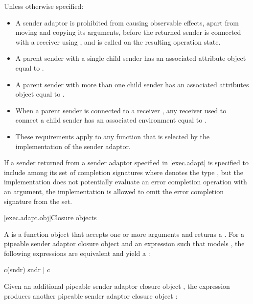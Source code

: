\pnum
Unless otherwise specified:
\begin{itemize}
\item
A sender adaptor is prohibited from causing observable effects,
apart from moving and copying its arguments,
before the returned sender is connected with a receiver using ,
and  is called on the resulting operation state.
\item
A parent sender with a single child sender  has
an associated attribute object equal to
.
\item
A parent sender with more than one child sender has
an associated attributes object equal to .
\item
When a parent sender is connected to a receiver ,
any receiver used to connect a child sender has
an associated environment equal to .
\item
These requirements apply to any function
that is selected by the implementation of the sender adaptor.
\end{itemize}

\pnum
If a sender returned from a sender adaptor specified in \ref{exec.adapt}
is specified to include 
among its set of completion signatures
where  denotes the type ,
but the implementation does not potentially evaluate
an error completion operation with an  argument,
the implementation is allowed to omit
the  error completion signature from the set.

[exec.adapt.obj]{Closure objects}

\pnum
A  is a function object
that accepts one or more  arguments and returns a .
For a pipeable sender adaptor closure object  and
an expression 
such that  models ,
the following expressions are equivalent and yield a :
\begin{codeblock}
c(sndr)
sndr | c
\end{codeblock}
Given an additional pipeable sender adaptor closure object ,
the expression  produces
another pipeable sender adaptor closure object :

